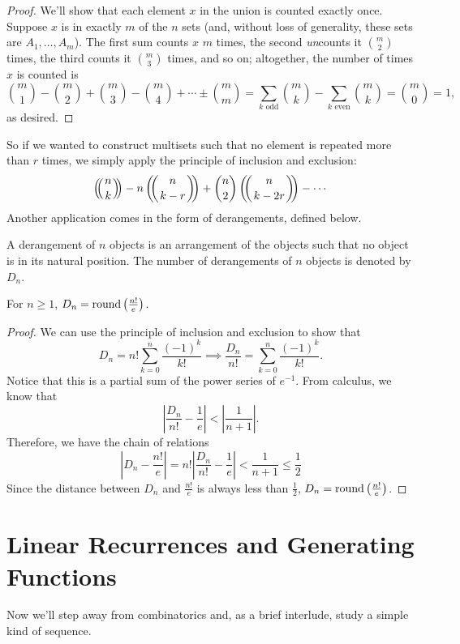 \documentclass[../m055main.tex]{subfiles}
\begin{document}
\begin{proof}
    We'll show that each element $x$ in the union is counted exactly once.
    Suppose $x$ is in exactly $m$ of the $n$ sets (and, without loss of generality, these sets are $A_1, \ldots, A_m$).
    The first sum counts $x$ $m$ times, the second \textit{un}counts it $\binom{m}{2}$ times, the third counts it $\binom{m}{3}$ times, and so on; altogether, the number of times $x$ is counted is
    \[ \binom{m}{1} - \binom{m}{2} + \binom{m}{3} - \binom{m}{4} + \cdots \pm \binom{m}{m} = \sum_{k\text{ odd}} \binom{m}{k} - \sum_{k\text{ even}} \binom{m}{k} = \binom{m}{0} = 1, \]
    as desired.
\end{proof}

So if we wanted to construct multisets such that no element is repeated more than $r$ times, we simply apply the principle of inclusion and exclusion:
\[ \mchoose{n}{k} - n \mchoose{n}{k-r} + \binom{n}{2} \mchoose{n}{k-2r} - \cdots \]
Another application comes in the form of derangements, defined below.

\begin{definition}[Derangement]
    A derangement of $n$ objects is an arrangement of the objects such that no object is in its natural position.
    The number of derangements of $n$ objects is denoted by $D_n$.
\end{definition}

\begin{theorem}[]
    For $n \geq 1$, $D_n = \textrm{round} \left( \frac{n!}{e} \right)$.
\end{theorem}

\begin{proof}
    We can use the principle of inclusion and exclusion to show that
    \[ D_n = n! \sum_{k=0}^{n} \frac{(-1)^k}{k!} \implies \frac{D_n}{n!} = \sum_{k=0}^{n} \frac{(-1)^k}{k!}. \]
    Notice that this is a partial sum of the power series of $e^{-1}$.
    From calculus, we know that
    \[ \left| \frac{D_n}{n!} - \frac{1}{e} \right| < \left| \frac{1}{n+1} \right|. \]
    Therefore, we have the chain of relations
    \[ \left| D_n - \frac{n!}{e} \right| = n! \left| \frac{D_n}{n!} - \frac{1}{e} \right| < \frac{1}{n+1} \leq \frac{1}{2} \]
    Since the distance between $D_n$ and $\frac{n!}{e}$ is always less than $\frac{1}{2}$, $D_n =\textrm{round}\left( \frac{n!}{e} \right)$.
\end{proof}

\section{Linear Recurrences and Generating Functions}
Now we'll step away from combinatorics and, as a brief interlude, study a simple kind of sequence.
\end{document}
